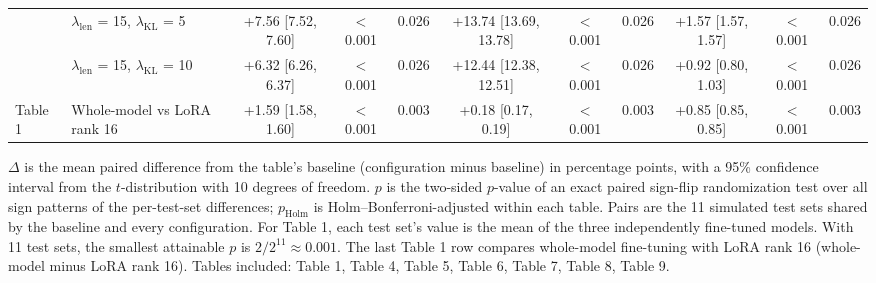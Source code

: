 \begin{table}[!htb]
{\begin{tabular}{llccccccccc}
 & $\lambda_{\mathrm{len}}$ = 15, $\lambda_{\mathrm{KL}}$ = 5 & +7.56 [7.52, 7.60] & $<$0.001 & 0.026 & +13.74 [13.69, 13.78] & $<$0.001 & 0.026 & +1.57 [1.57, 1.57] & $<$0.001 & 0.026 \\
 & $\lambda_{\mathrm{len}}$ = 15, $\lambda_{\mathrm{KL}}$ = 10 & +6.32 [6.26, 6.37] & $<$0.001 & 0.026 & +12.44 [12.38, 12.51] & $<$0.001 & 0.026 & +0.92 [0.80, 1.03] & $<$0.001 & 0.026 \\
\midrule
\multirow{1}{*}{Table 1} & Whole-model vs LoRA rank 16 & +1.59 [1.58, 1.60] & $<$0.001 & 0.003 & +0.18 [0.17, 0.19] & $<$0.001 & 0.003 & +0.85 [0.85, 0.85] & $<$0.001 & 0.003 \\
\bottomrule
\end{tabular}}
\begin{flushleft}\footnotesize $\Delta$ is the mean paired difference from the table's baseline (configuration minus baseline) in percentage points, with a 95\% confidence interval from the $t$-distribution with 10 degrees of freedom. $p$ is the two-sided $p$-value of an exact paired sign-flip randomization test over all sign patterns of the per-test-set differences; $p_{\mathrm{Holm}}$ is Holm--Bonferroni-adjusted within each table. Pairs are the 11 simulated test sets shared by the baseline and every configuration. For Table 1, each test set's value is the mean of the three independently fine-tuned models. With 11 test sets, the smallest attainable $p$ is $2/2^{11} \approx 0.001$. The last Table 1 row compares whole-model fine-tuning with LoRA rank 16 (whole-model minus LoRA rank 16). Tables included: Table 1, Table 4, Table 5, Table 6, Table 7, Table 8, Table 9.
\end{flushleft}
\end{table}